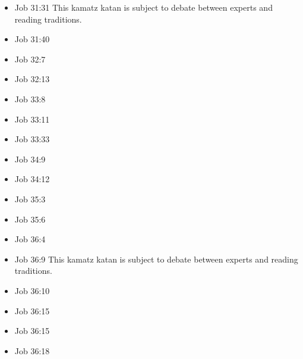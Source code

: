 \documentclass[14pt]{article}
\begin{document}
\begin{multicols}{2}
\begin{itemize}
															\item Job 31:31 This kamatz katan is subject to debate between experts and reading traditions.
															
															\item Job 31:40
															
															\item Job 32:7
															
															\item Job 32:13
															
															\item Job 33:8
															
															\item Job 33:11
															
															\item Job 33:33
															
															\item Job 34:9
															
															\item Job 34:12
															
															\item Job 35:3
															
															\item Job 35:6
															
															\item Job 36:4
															
															\item Job 36:9 This kamatz katan is subject to debate between experts and reading traditions.
															
															\item Job 36:10
															
															\item Job 36:15
															
															\item Job 36:15
															
															\item Job 36:18
															

\end{itemize}
\end{multicols}
\end{document}
